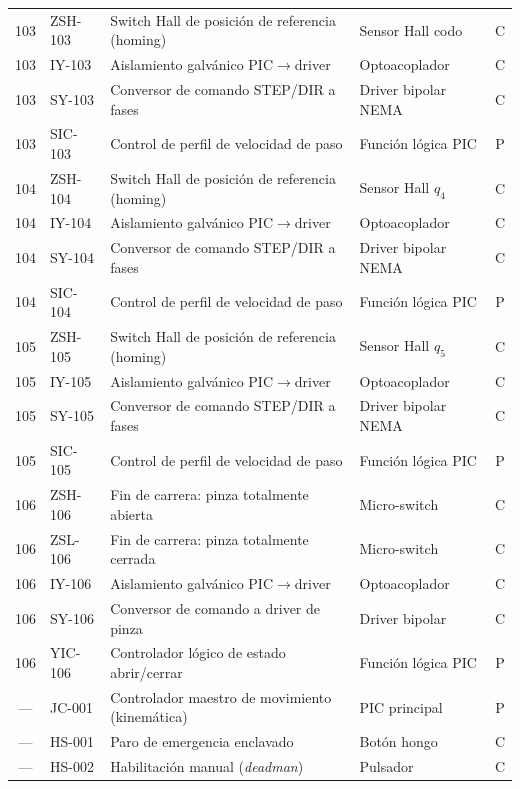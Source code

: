 \documentclass[11pt]{article}
\begin{document}
\begin{longtable}{@{}c l p{5.4cm} l c@{}}
	\midrule
	103 & ZSH-103 & Switch Hall de posición de referencia (homing) & Sensor Hall codo    & C \\
	103 & IY-103  & Aislamiento galvánico PIC$\rightarrow$driver     & Optoacoplador       & C \\
	103 & SY-103  & Conversor de comando STEP/DIR a fases            & Driver bipolar NEMA & C \\
	103 & SIC-103 & Control de perfil de velocidad de paso           & Función lógica PIC  & P \\
	\midrule
	104 & ZSH-104 & Switch Hall de posición de referencia (homing) & Sensor Hall $q_4$   & C \\
	104 & IY-104  & Aislamiento galvánico PIC$\rightarrow$driver     & Optoacoplador       & C \\
	104 & SY-104  & Conversor de comando STEP/DIR a fases            & Driver bipolar NEMA & C \\
	104 & SIC-104 & Control de perfil de velocidad de paso           & Función lógica PIC  & P \\
	\midrule
	105 & ZSH-105 & Switch Hall de posición de referencia (homing) & Sensor Hall $q_5$   & C \\
	105 & IY-105  & Aislamiento galvánico PIC$\rightarrow$driver     & Optoacoplador       & C \\
	105 & SY-105  & Conversor de comando STEP/DIR a fases            & Driver bipolar NEMA & C \\
	105 & SIC-105 & Control de perfil de velocidad de paso           & Función lógica PIC  & P \\
	\midrule
	106 & ZSH-106 & Fin de carrera: pinza totalmente abierta       & Micro-switch        & C \\
	106 & ZSL-106 & Fin de carrera: pinza totalmente cerrada       & Micro-switch        & C \\
	106 & IY-106  & Aislamiento galvánico PIC$\rightarrow$driver     & Optoacoplador       & C \\
	106 & SY-106  & Conversor de comando a driver de pinza           & Driver bipolar      & C \\
	106 & YIC-106 & Controlador lógico de estado abrir/cerrar        & Función lógica PIC  & P \\
	\midrule
	--- & JC-001  & Controlador maestro de movimiento (kinemática)   & PIC principal       & P \\
	--- & HS-001  & Paro de emergencia enclavado                     & Botón hongo         & C \\
	--- & HS-002  & Habilitación manual (\emph{deadman})             & Pulsador            & C \\
\end{longtable}
\end{document}
